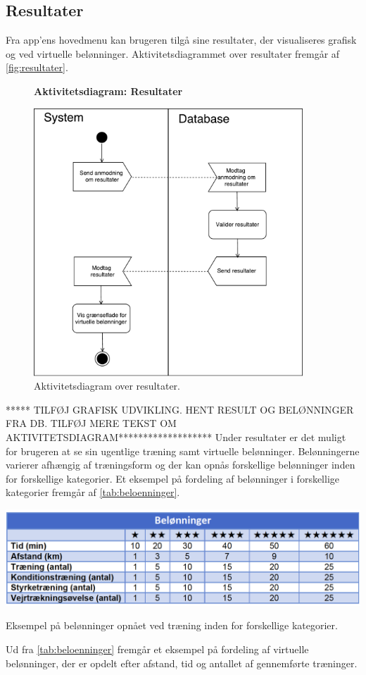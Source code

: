 \subsection*{Resultater}
Fra app'ens hovedmenu kan brugeren tilgå sine resultater, der visualiseres grafisk og ved virtuelle belønninger.
Aktivitetsdiagrammet over resultater fremgår af \autoref{fig:resultater}.

\begin{figure} [H]
\centering
\textbf{Aktivitetsdiagram: Resultater}\par\medskip
\includegraphics[width=0.9\textwidth]{figures/aktivitetsdiagram/Resultater}
\caption{Aktivitetsdiagram over resultater.}
\label{fig:resultater}
\end{figure}

\noindent
***** TILFØJ GRAFISK UDVIKLING. HENT RESULT OG BELØNNINGER FRA DB. TILFØJ MERE TEKST OM AKTIVITETSDIAGRAM*******************
Under resultater er det muligt for brugeren at se sin ugentlige træning samt virtuelle belønninger. Belønningerne varierer afhængig af træningsform og der kan opnås forskellige belønninger inden for forskellige kategorier. Et eksempel på fordeling af belønninger i forskellige kategorier fremgår af \autoref{tab:beloenninger}.

\begin{table} [H]
\centering
\includegraphics[width=1\textwidth]{figures/aktivitetsdiagram/beloenninger}
\caption{Eksempel på belønninger opnået ved træning inden for forskellige kategorier.}
\label{tab:beloenninger}
\end{table}

\noindent
Ud fra \autoref{tab:beloenninger} fremgår et eksempel på fordeling af virtuelle belønninger, der er opdelt efter afstand, tid og antallet af gennemførte træninger. 